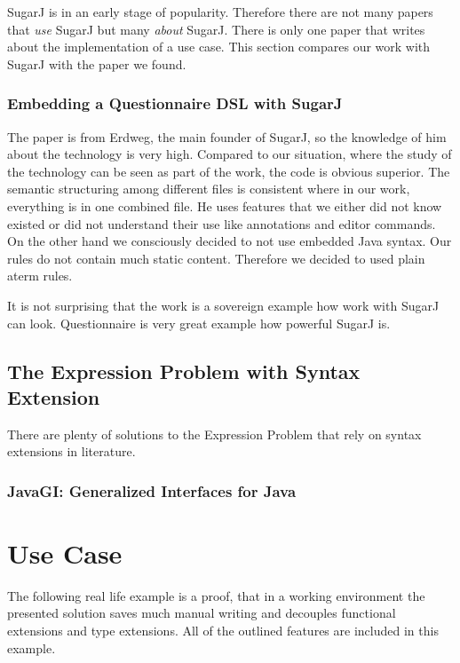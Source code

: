 \documentclass{report}
\begin{document}
SugarJ is in an early stage of popularity. Therefore there are not many papers that \emph{use} SugarJ but many \emph{about} SugarJ. There is only one paper that writes about the implementation of a use case. This section compares our work with SugarJ with the paper we found.

\subsection{Embedding a Questionnaire DSL with SugarJ \cite{Erdweg-Questionnaire-2013}}

The paper is from Erdweg, the main founder of SugarJ, so the knowledge of him about the technology is very high. Compared to our situation, where the study of the technology can be seen as part of the work, the code is obvious superior. The semantic structuring among different files is consistent where in our work, everything is in one combined file. He uses features that we either did not know existed or did not understand their use like annotations and editor commands. On the other hand we consciously decided to not use embedded Java syntax. Our rules do not contain much static content. Therefore we decided to used plain aterm rules.

It is not surprising that the work is a sovereign example how work with SugarJ can look. Questionnaire is very great example how powerful SugarJ is.

\section{The Expression Problem with Syntax Extension}

There are plenty of solutions to the Expression Problem that rely on syntax extensions in literature.

\subsection{JavaGI: Generalized Interfaces for Java \cite{Wehr-JavaGI-2007}}

\chapter{Use Case}

The following real life example is a proof, that in a working environment the presented solution saves much manual writing and decouples functional extensions and type extensions. All of the outlined features are included in this example.
\end{document}
